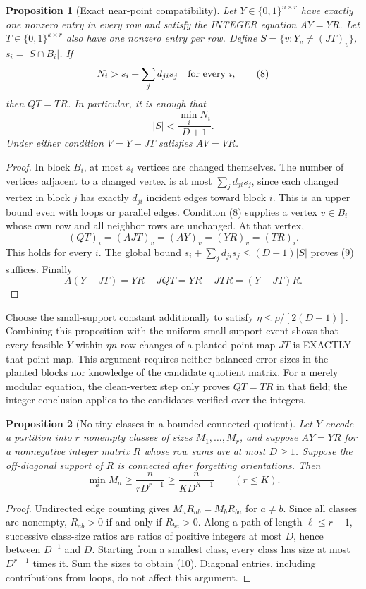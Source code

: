 \documentclass[11pt]{article}
\newtheorem{proposition}{Proposition}
\begin{document}
\begin{proposition}[Exact near-point compatibility]
Let $Y\in\{0,1\}^{n\times r}$ have exactly one nonzero entry in every
row and satisfy the INTEGER equation $AY=YR$. Let
$T\in\{0,1\}^{k\times r}$ also have one nonzero entry per row. Define
$S=\{v:Y_v\ne(JT)_v\}$, $s_i=|S\cap B_i|$. If
\[
 N_i>s_i+\sum_jd_{ji}s_j\quad\hbox{for every }i,    \tag{8}
\]
then $QT=TR$. In particular, it is enough that
\[
 |S|<\frac{\min_iN_i}{D+1}.
 \tag{9}
\]
Under either condition $V=Y-JT$ satisfies $AV=VR$.
\end{proposition}
\begin{proof}
In block $B_i$, at most $s_i$ vertices are changed themselves. The
number of vertices adjacent to a changed vertex is at most
$\sum_jd_{ji}s_j$, since each changed vertex in block $j$ has exactly
$d_{ji}$ incident edges toward block $i$. This is an upper bound even
with loops or parallel edges. Condition (8) supplies a vertex $v\in B_i$
whose own row and all neighbor rows are unchanged. At that vertex,
\[
 (QT)_i=(AJT)_v=(AY)_v=(YR)_v=(TR)_i.
\]
This holds for every $i$. The global bound
$s_i+\sum_jd_{ji}s_j\leq(D+1)|S|$ proves (9) suffices. Finally
\[
 A(Y-JT)=YR-JQT=YR-JTR=(Y-JT)R.
\]
\end{proof}

Choose the small-support constant additionally to satisfy
$\eta\leq\rho/[2(D+1)]$. Combining this proposition with the uniform
small-support event shows that every feasible $Y$ within $\eta n$ row
changes of a planted point map $JT$ is EXACTLY that point map. This
argument requires neither balanced error sizes in the planted blocks nor
knowledge of the candidate quotient matrix. For a merely modular equation,
the clean-vertex step only proves $QT=TR$ in that field; the integer
conclusion applies to the candidates verified over the integers.

\begin{proposition}[No tiny classes in a bounded connected quotient]
Let $Y$ encode a partition into $r$ nonempty classes of sizes
$M_1,\ldots,M_r$, and suppose $AY=YR$ for a nonnegative integer matrix
$R$ whose row sums are at most $D\geq1$. Suppose the off-diagonal support
of $R$ is connected after forgetting orientations. Then
\[
 \min_aM_a\geq\frac{n}{rD^{r-1}}
 \geq\frac{n}{KD^{K-1}}\qquad(r\leq K).
 \tag{10}
\]
\end{proposition}
\begin{proof}
Undirected edge counting gives $M_aR_{ab}=M_bR_{ba}$ for $a\ne b$.
Since all classes are nonempty, $R_{ab}>0$ if and only if $R_{ba}>0$.
Along a path of length $\ell\leq r-1$, successive class-size ratios
are ratios of positive integers at most $D$, hence between $D^{-1}$
and $D$. Starting from a smallest class, every class has size at most
$D^{r-1}$ times it. Sum the sizes to obtain (10). Diagonal entries,
including contributions from loops, do not affect this argument.
\end{proof}
\end{document}
